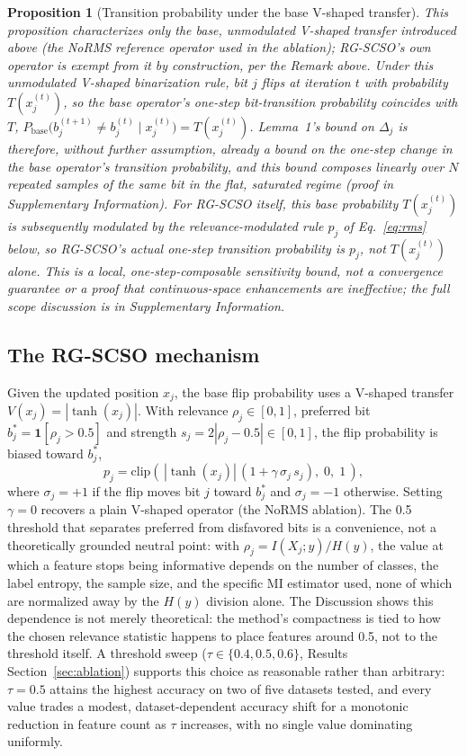 \documentclass[preprint,3p,times]{elsarticle}
\newtheorem{proposition}[lemma]{Proposition}
\begin{document}
\begin{proposition}[Transition probability under the base V-shaped transfer]
This proposition characterizes only the base, unmodulated V-shaped transfer
introduced above (the NoRMS reference operator used in the ablation);
RG-SCSO's own operator is exempt from it by construction, per the Remark
above. Under this unmodulated V-shaped binarization rule, bit $j$
flips at iteration $t$ with probability $T(x_j^{(t)})$, so the base
operator's one-step bit-transition probability coincides with $T$,
$P_{\text{base}}\big(b_j^{(t+1)}\ne b_j^{(t)}\mid x_j^{(t)}\big)=T(x_j^{(t)})$.
Lemma~1's
bound on $\Delta_j$ is therefore, without further assumption, already a
bound on the one-step change in the base operator's transition probability,
and this bound
composes linearly over $N$ repeated samples of the same bit in the flat,
saturated regime (proof in Supplementary Information). For RG-SCSO itself,
this base probability $T(x_j^{(t)})$ is subsequently modulated by the
relevance-modulated rule $p_j$ of Eq.~\ref{eq:rms} below, so RG-SCSO's
actual one-step transition probability is $p_j$, not $T(x_j^{(t)})$ alone.
This is a local,
one-step-composable sensitivity bound, not a convergence guarantee or a
proof that continuous-space enhancements are ineffective; the full scope
discussion is in Supplementary Information.
\end{proposition}

\subsection{The RG-SCSO mechanism}
Given the updated position $x_j$, the base flip probability uses a V-shaped
transfer $V(x_j)=|\tanh(x_j)|$. With relevance $\rho_j\in[0,1]$, preferred bit
$b^\ast_j=\mathbf{1}[\rho_j>0.5]$ and strength $s_j=2|\rho_j-0.5|\in[0,1]$,
the flip probability is biased toward $b^\ast_j$,
\begin{equation}
  p_j = \mathrm{clip}\left(\,|\tanh(x_j)|\,(1+\gamma\,\sigma_j\,s_j),\;0,\;1\,\right),
  \label{eq:rms}
\end{equation}
where $\sigma_j=+1$ if the flip moves bit $j$ toward $b^\ast_j$ and $\sigma_j=-1$
otherwise. Setting $\gamma=0$ recovers a plain V-shaped operator (the NoRMS
ablation). The 0.5 threshold that separates preferred from disfavored bits is
a convenience, not a theoretically grounded neutral point: with
$\rho_j=I(X_j;y)/H(y)$, the value at which a feature stops being informative
depends on the number of classes, the label entropy, the sample size, and
the specific MI estimator used, none of which are normalized away by the
$H(y)$ division alone. The Discussion shows this dependence is not merely
theoretical: the method's compactness is tied to how the chosen relevance
statistic happens to place features around 0.5, not to the threshold
itself. A threshold sweep ($\tau\in\{0.4,0.5,0.6\}$, Results
Section~\ref{sec:ablation}) supports this choice as reasonable rather than
arbitrary: $\tau=0.5$ attains the highest accuracy on two of five datasets
tested, and every value trades a modest, dataset-dependent accuracy shift
for a monotonic reduction in feature count as $\tau$ increases, with no
single value dominating uniformly.
\end{document}
